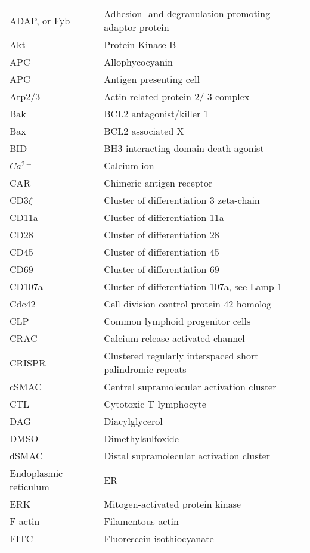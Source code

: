 \documentclass[phd,tocprelim]{cornell}
\renewcommand{\caption}[1]{\singlespacing\hangcaption{#1}\normalspacing}
\begin{document}
\abbrlist
\begin{longtable}{ p{} p{} }
	ADAP, or Fyb & Adhesion- and degranulation-promoting adaptor protein \\	
	Akt & Protein Kinase B \\
	APC & Allophycocyanin \\
	APC & Antigen presenting cell \\
	Arp2/3 	& Actin related protein-2/-3 complex \\
	Bak & BCL2 antagonist/killer 1 \\
	Bax & BCL2 associated X \\
	BID & BH3 interacting-domain death agonist \\
	$Ca^{2+}$ & Calcium ion \\
	CAR & Chimeric antigen receptor \\
	CD3$\zeta$ & Cluster of differentiation 3 zeta-chain \\
	CD11a & Cluster of differentiation 11a \\
	CD28 & Cluster of differentiation 28 \\
	CD45 & Cluster of differentiation 45 \\
	CD69 & Cluster of differentiation 69 \\
	CD107a & Cluster of differentiation 107a, see Lamp-1 \\
	Cdc42 & Cell division control protein 42 homolog \\
	CLP & Common lymphoid progenitor cells \\
	CRAC &  Calcium release-activated channel \\
	CRISPR & Clustered regularly interspaced short palindromic repeats \\
	cSMAC & Central supramolecular activation cluster \\
	CTL & Cytotoxic T lymphocyte \\
	DAG & Diacylglycerol \\
	DMSO & Dimethylsulfoxide \\
	dSMAC & Distal supramolecular activation cluster \\
	Endoplasmic reticulum & ER \\	
	ERK  & Mitogen-activated protein kinase \\
	F-actin & Filamentous actin \\
	FITC & Fluorescein isothiocyanate \\

\end{longtable}
\end{document}
